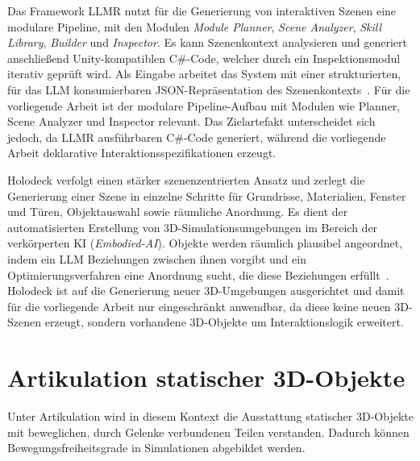 Das Framework LLMR nutzt für die Generierung von interaktiven Szenen eine modulare Pipeline, mit den Modulen \textit{Module Planner}, \textit{Scene Analyzer}, \textit{Skill Library}, \textit{Builder} und \textit{Inspector}. Es kann Szenenkontext analysieren und generiert anschließend Unity-kompatiblen C\#-Code, welcher durch ein Inspektionsmodul iterativ geprüft wird. Als Eingabe arbeitet das System mit einer strukturierten, für das LLM konsumierbaren JSON-Repräsentation des Szenenkontexts~\cite{delatorreLLMRRealtimePrompting2024}.
Für die vorliegende Arbeit ist der modulare Pipeline-Aufbau mit Modulen wie Planner, Scene Analyzer und Inspector relevant. Das Zielartefakt unterscheidet sich jedoch, da LLMR ausführbaren C\#-Code generiert, während die vorliegende Arbeit deklarative Interaktionsspezifikationen erzeugt.

Holodeck verfolgt einen stärker szenenzentrierten Ansatz und zerlegt die Generierung einer Szene in einzelne Schritte für Grundrisse, Materialien, Fenster und Türen, Objektauswahl sowie räumliche Anordnung.
Es dient der automatisierten Erstellung von 3D-Simulationsumgebungen im Bereich der verkörperten KI (\textit{Embodied-AI}). Objekte werden räumlich plausibel angeordnet, indem ein LLM Beziehungen zwischen ihnen vorgibt und ein Optimierungsverfahren eine Anordnung sucht, die diese Beziehungen erfüllt~\cite{yangHolodeckLanguageGuided2024}.
Holodeck ist auf die Generierung neuer 3D-Umgebungen ausgerichtet und damit für die vorliegende Arbeit nur eingeschränkt anwendbar, da diese keine neuen 3D-Szenen erzeugt, sondern vorhandene 3D-Objekte um Interaktionslogik erweitert.

\section{Artikulation statischer 3D-Objekte}

Unter Artikulation wird in diesem Kontext die Ausstattung statischer 3D-Objekte mit beweglichen, durch Gelenke verbundenen Teilen verstanden. Dadurch können Bewegungsfreiheitsgrade in Simulationen abgebildet werden.

